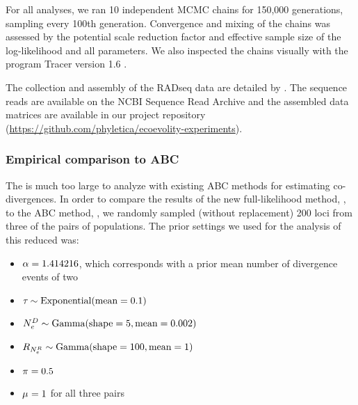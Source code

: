 For all analyses, we ran 10 independent MCMC chains for 150,000 generations,
sampling every 100th generation.
Convergence and mixing of the chains was assessed by the potential scale
reduction factor
\citep[PSRF; the square root of Equation 1.1 in][]{Brooks1998}
and effective sample size
\citep[ESS;][]{Gong2014}
of the log-likelihood and all parameters.
We also inspected the chains visually with the program Tracer version 1.6
\citep{Tracer16}.

The collection and assembly of the  RADseq data are detailed by
\citet{Oaks2018paic}.
The sequence reads are available on the NCBI Sequence Read Archive
and the assembled data matrices are available in our project repository
(\url{https://github.com/phyletica/ecoevolity-experiments}).

\subsubsection{Empirical comparison to ABC}
The  \dataset is much too large to analyze with existing ABC
methods for estimating co-divergences.
In order to compare the results of the new full-likelihood method, \ecoevolity,
to the ABC method, \dppmsbayes, we randomly sampled (without replacement) 200
loci from three of the pairs of  populations.
The prior settings we used for the \ecoevolity analysis of this reduced
\dataset was:
\begin{itemize}
    \item $\concentration = 1.414216$, which corresponds with a prior mean
        number of divergence events of two
    \item $\divtime \sim \dexponential{0.1}$
    \item $\epopsize[\descendantpopindex{}] \sim \dgamma{5}{0.002}$
    \item $\rootrelativepopsize \sim \dgamma{100}{1}$
    \item $\gfreq = 0.5$
    \item $\murate = 1$ for all three pairs
\end{itemize}

